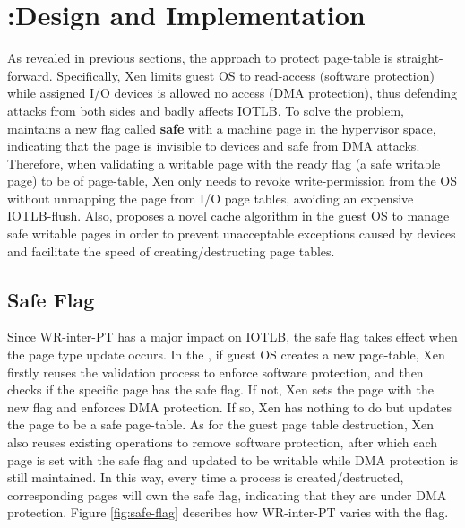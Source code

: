 \section{\name:Design and Implementation}



As revealed in previous sections, the approach to protect page-table is straight-forward. Specifically, Xen limits guest OS to read-access (software protection) while assigned I/O devices is allowed no access (DMA protection), thus defending attacks from both sides and badly affects IOTLB. To solve the problem, \name maintains a new flag called \textbf{safe} with a machine page in the hypervisor space, indicating that the page is invisible to devices and safe from DMA attacks. Therefore, when validating a writable page with the ready flag (a safe writable page) to be of page-table, Xen only needs to revoke write-permission from the OS without unmapping the page from I/O page tables, avoiding an expensive IOTLB-flush. Also, \name proposes a novel cache algorithm in the guest OS to manage safe writable pages in order to prevent unacceptable exceptions caused by devices and facilitate the speed of creating/destructing page tables.

\subsection{Safe Flag}
Since WR-inter-PT has a major impact on IOTLB, the safe flag takes effect when the page type update occurs. In the \name, if guest OS creates a new page-table, Xen firstly reuses the validation process to enforce software protection, and then checks if the specific page has the safe flag. If not, Xen sets the page with the new flag and enforces DMA protection. If so, Xen has nothing to do but updates the page to be a safe page-table. As for the guest page table destruction, Xen also reuses existing operations to remove software protection, after which each page is set with the safe flag and updated to be writable while DMA protection is still maintained. In this way, every time a process is created/destructed, corresponding pages will own the safe flag, indicating that they are under DMA protection. Figure \ref{fig:safe-flag} describes how WR-inter-PT varies with the flag.

